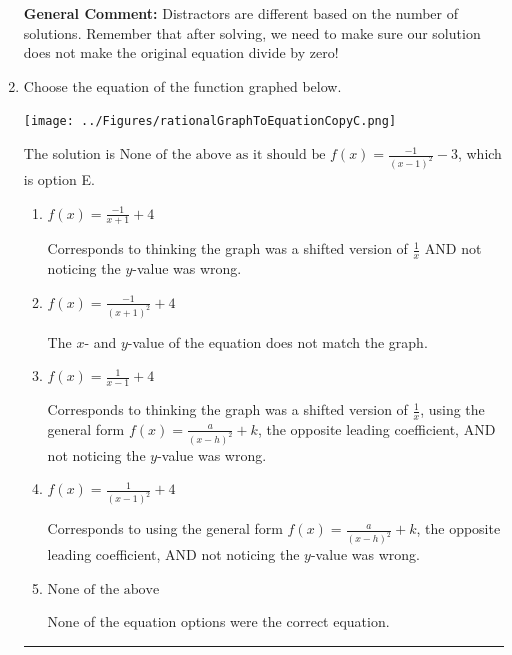 \documentclass{extbook}[14pt]
\newcommand{\litem}[1]{\item #1

\rule{\textwidth}{0.4pt}}
\begin{document}
\begin{enumerate}
{\textbf{General Comment:} Distractors are different based on the number of solutions. Remember that after solving, we need to make sure our solution does not make the original equation divide by zero!
}
\litem{
Choose the equation of the function graphed below.

\begin{center}
    \texttt{[image: ../Figures/rationalGraphToEquationCopyC.png]}
\end{center}


The solution is \( \text{None of the above as it should be } f(x) = \frac{-1}{(x - 1)^2} - 3 \), which is option E.\begin{enumerate}[label=\Alph*.]
\item \( f(x) = \frac{-1}{x + 1} + 4 \)

Corresponds to thinking the graph was a shifted version of $\frac{1}{x}$ AND not noticing the $y$-value was wrong.
\item \( f(x) = \frac{-1}{(x + 1)^2} + 4 \)

The $x$- and $y$-value of the equation does not match the graph.
\item \( f(x) = \frac{1}{x - 1} + 4 \)

Corresponds to thinking the graph was a shifted version of $\frac{1}{x}$, using the general form $f(x) = \frac{a}{(x-h)^2}+k$, the opposite leading coefficient, AND not noticing the $y$-value was wrong.
\item \( f(x) = \frac{1}{(x - 1)^2} + 4 \)

Corresponds to using the general form $f(x) = \frac{a}{(x-h)^2}+k$, the opposite leading coefficient, AND not noticing the $y$-value was wrong.
\item \( \text{None of the above} \)

None of the equation options were the correct equation.
\end{enumerate}

}
\end{enumerate}
\end{document}
